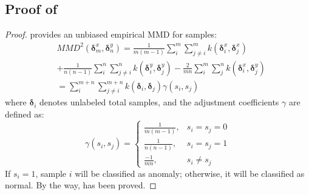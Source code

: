 \documentclass{article}
\begin{document}
\subsection{Proof of }\label{proof:opt_s}
\begin{proof}
\cite{gretton2012kernel} provides an unbiased empirical MMD for samples:
\begin{equation}\label{eq:MMD_XY}
    \begin{aligned}
        & MMD^2\left(\bm{\delta}_m^x, \bm{\delta}_n^y\right) = \frac{1}{m(m-1)}\sum_{i}^{m}\sum_{j\neq i}^{m}k(\bm{\delta}_i^x, \bm{\delta}_j^x) \\
        & + \frac{1}{n(n-1)}\sum_{i}^{n}\sum_{j\neq i}^{n}k(\bm{\delta}_i^y, \bm{\delta}_j^y) - \frac{2}{mn}\sum_{i}^{m}\sum_{j}^{n}k(\bm{\delta}_i^x, \bm{\delta}_j^y) \\
        & = \sum_{i}^{m+n}\sum_{j\neq i}^{m+n}k(\bm{\delta}_i, \bm{\delta}_j)\gamma(s_i, s_j)
    \end{aligned}
\end{equation}
where $\bm{\delta}_i$ denotes unlabeled total samples, and the adjustment coefficients $\gamma$ are defined as:
\begin{equation}
    \gamma(s_i, s_j) =
    \begin{cases}
        \frac{1}{m(m-1)}, & s_i = s_j = 0 \\
        \frac{1}{n(n-1)}, & s_i = s_j = 1 \\
        \frac{-1}{mn}, & s_i \neq s_j
    \end{cases}
\end{equation}
If $s_i = 1$, sample $i$ will be classified as anomaly; otherwise, it will be classified as normal.
By the way,  has been proved.
\end{proof}
\end{document}
